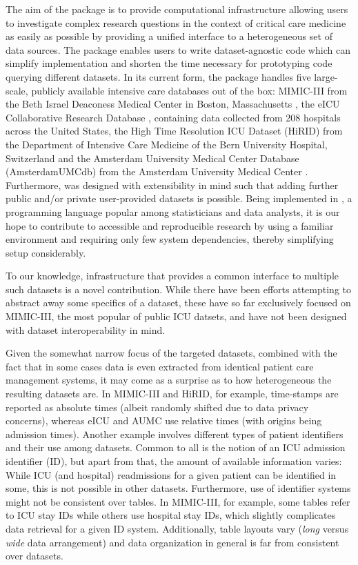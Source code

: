 \documentclass[
  notitle]{jss}
\begin{document}
The aim of the
\href{https://cran.r-project.org/package=ricu}{} package is to
provide computational infrastructure allowing users to investigate
complex research questions in the context of critical care medicine as
easily as possible by providing a unified interface to a heterogeneous
set of data sources. The package enables users to write dataset-agnostic
code which can simplify implementation and shorten the time necessary
for prototyping code querying different datasets. In its current form,
the package handles five large-scale, publicly available intensive care
databases out of the box: MIMIC-III from the Beth Israel Deaconess
Medical Center in Boston, Massachusetts \citep{johnson2016}, the eICU
Collaborative Research Database \citep{pollard2018}, containing data
collected from 208 hospitals across the United States, the High Time
Resolution ICU Dataset (HiRID) from the Department of Intensive Care
Medicine of the Bern University Hospital, Switzerland \citep{faltys2021}
and the Amsterdam University Medical Center Database (AmsterdamUMCdb)
from the Amsterdam University Medical Center \citep{thoral2021}.
Furthermore,  was designed with extensibility in mind such
that adding further public and/or private user-provided datasets is
possible. Being implemented in , a programming language
popular among statisticians and data analysts, it is our hope to
contribute to accessible and reproducible research by using a familiar
environment and requiring only few system dependencies, thereby
simplifying setup considerably.

To our knowledge, infrastructure that provides a common interface to
multiple such datasets is a novel contribution. While there have been
efforts \citep{adibuzzaman2016, wang2020} attempting to abstract away
some specifics of a dataset, these have so far exclusively focused on
MIMIC-III, the most popular of public ICU datsets, and have not been
designed with dataset interoperability in mind.

Given the somewhat narrow focus of the targeted datasets, combined with
the fact that in some cases data is even extracted from identical
patient care management systems, it may come as a surprise as to how
heterogeneous the resulting datasets are. In MIMIC-III and HiRID, for
example, time-stamps are reported as absolute times (albeit randomly
shifted due to data privacy concerns), whereas eICU and AUMC use
relative times (with origins being admission times). Another example
involves different types of patient identifiers and their use among
datasets. Common to all is the notion of an ICU admission identifier
(ID), but apart from that, the amount of available information varies:
While ICU (and hospital) readmissions for a given patient can be
identified in some, this is not possible in other datasets. Furthermore,
use of identifier systems might not be consistent over tables. In
MIMIC-III, for example, some tables refer to ICU stay IDs while others
use hospital stay IDs, which slightly complicates data retrieval for a
given ID system. Additionally, table layouts vary (\emph{long} versus
\emph{wide} data arrangement) and data organization in general is far
from consistent over datasets.
\end{document}
